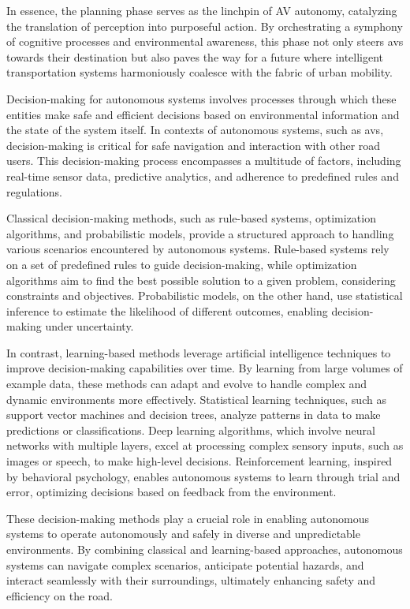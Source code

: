In essence, the planning phase serves as the linchpin of AV autonomy, catalyzing the translation of perception into purposeful action. By orchestrating a symphony of cognitive processes and environmental awareness, this phase not only steers \glspl{av} towards their destination but also paves the way for a future where intelligent transportation systems harmoniously coalesce with the fabric of urban mobility.


Decision-making for autonomous systems involves processes through which these entities make safe and efficient decisions based on environmental information and the state of the system itself. In contexts of autonomous systems, such as \glspl{av}, decision-making is critical for safe navigation and interaction with other road users. This decision-making process encompasses a multitude of factors, including real-time sensor data, predictive analytics, and adherence to predefined rules and regulations.

Classical decision-making methods, such as rule-based systems, optimization algorithms, and probabilistic models, provide a structured approach to handling various scenarios encountered by autonomous systems. Rule-based systems rely on a set of predefined rules to guide decision-making, while optimization algorithms aim to find the best possible solution to a given problem, considering constraints and objectives. Probabilistic models, on the other hand, use statistical inference to estimate the likelihood of different outcomes, enabling decision-making under uncertainty.

In contrast, learning-based methods leverage artificial intelligence techniques to improve decision-making capabilities over time. By learning from large volumes of example data, these methods can adapt and evolve to handle complex and dynamic environments more effectively. Statistical learning techniques, such as support vector machines and decision trees, analyze patterns in data to make predictions or classifications. Deep learning algorithms, which involve neural networks with multiple layers, excel at processing complex sensory inputs, such as images or speech, to make high-level decisions. Reinforcement learning, inspired by behavioral psychology, enables autonomous systems to learn through trial and error, optimizing decisions based on feedback from the environment.

These decision-making methods play a crucial role in enabling autonomous systems to operate autonomously and safely in diverse and unpredictable environments. By combining classical and learning-based approaches, autonomous systems can navigate complex scenarios, anticipate potential hazards, and interact seamlessly with their surroundings, ultimately enhancing safety and efficiency on the road.

